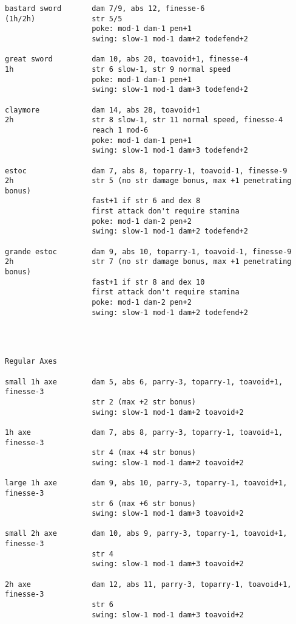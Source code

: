 \begin{verbatim}
bastard sword       dam 7/9, abs 12, finesse-6
(1h/2h)             str 5/5
                    poke: mod-1 dam-1 pen+1
                    swing: slow-1 mod-1 dam+2 todefend+2

great sword         dam 10, abs 20, toavoid+1, finesse-4
1h                  str 6 slow-1, str 9 normal speed
                    poke: mod-1 dam-1 pen+1
                    swing: slow-1 mod-1 dam+3 todefend+2

claymore            dam 14, abs 28, toavoid+1
2h                  str 8 slow-1, str 11 normal speed, finesse-4
                    reach 1 mod-6
                    poke: mod-1 dam-1 pen+1
                    swing: slow-1 mod-1 dam+3 todefend+2

estoc               dam 7, abs 8, toparry-1, toavoid-1, finesse-9
2h                  str 5 (no str damage bonus, max +1 penetrating bonus)
                    fast+1 if str 6 and dex 8
                    first attack don't require stamina
                    poke: mod-1 dam-2 pen+2
                    swing: slow-1 mod-1 dam+2 todefend+2

grande estoc        dam 9, abs 10, toparry-1, toavoid-1, finesse-9
2h                  str 7 (no str damage bonus, max +1 penetrating bonus)
                    fast+1 if str 8 and dex 10
                    first attack don't require stamina
                    poke: mod-1 dam-2 pen+2
                    swing: slow-1 mod-1 dam+2 todefend+2




\end{verbatim} \pagebreak[3] \begin{verbatim}
Regular Axes

small 1h axe        dam 5, abs 6, parry-3, toparry-1, toavoid+1, finesse-3
                    str 2 (max +2 str bonus)
                    swing: slow-1 mod-1 dam+2 toavoid+2

1h axe              dam 7, abs 8, parry-3, toparry-1, toavoid+1, finesse-3
                    str 4 (max +4 str bonus)
                    swing: slow-1 mod-1 dam+2 toavoid+2

large 1h axe        dam 9, abs 10, parry-3, toparry-1, toavoid+1, finesse-3
                    str 6 (max +6 str bonus)
                    swing: slow-1 mod-1 dam+3 toavoid+2

small 2h axe        dam 10, abs 9, parry-3, toparry-1, toavoid+1, finesse-3
                    str 4
                    swing: slow-1 mod-1 dam+3 toavoid+2

2h axe              dam 12, abs 11, parry-3, toparry-1, toavoid+1, finesse-3
                    str 6
                    swing: slow-1 mod-1 dam+3 toavoid+2


\end{verbatim}
